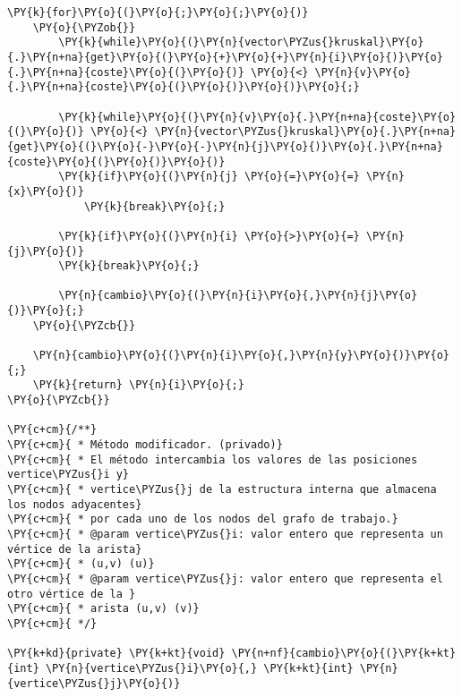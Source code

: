 \begin{Verbatim}[commandchars=\\\{\}]
    \PY{k}{for}\PY{o}{(}\PY{o}{;}\PY{o}{;}\PY{o}{)}
	\PY{o}{\PYZob{}}
	    \PY{k}{while}\PY{o}{(}\PY{n}{vector\PYZus{}kruskal}\PY{o}{.}\PY{n+na}{get}\PY{o}{(}\PY{o}{+}\PY{o}{+}\PY{n}{i}\PY{o}{)}\PY{o}{.}\PY{n+na}{coste}\PY{o}{(}\PY{o}{)} \PY{o}{<} \PY{n}{v}\PY{o}{.}\PY{n+na}{coste}\PY{o}{(}\PY{o}{)}\PY{o}{)}\PY{o}{;}

	    \PY{k}{while}\PY{o}{(}\PY{n}{v}\PY{o}{.}\PY{n+na}{coste}\PY{o}{(}\PY{o}{)} \PY{o}{<} \PY{n}{vector\PYZus{}kruskal}\PY{o}{.}\PY{n+na}{get}\PY{o}{(}\PY{o}{-}\PY{o}{-}\PY{n}{j}\PY{o}{)}\PY{o}{.}\PY{n+na}{coste}\PY{o}{(}\PY{o}{)}\PY{o}{)}
		\PY{k}{if}\PY{o}{(}\PY{n}{j} \PY{o}{=}\PY{o}{=} \PY{n}{x}\PY{o}{)}
		    \PY{k}{break}\PY{o}{;}

	    \PY{k}{if}\PY{o}{(}\PY{n}{i} \PY{o}{>}\PY{o}{=} \PY{n}{j}\PY{o}{)}
		\PY{k}{break}\PY{o}{;}

	    \PY{n}{cambio}\PY{o}{(}\PY{n}{i}\PY{o}{,}\PY{n}{j}\PY{o}{)}\PY{o}{;}
	\PY{o}{\PYZcb{}}

    \PY{n}{cambio}\PY{o}{(}\PY{n}{i}\PY{o}{,}\PY{n}{y}\PY{o}{)}\PY{o}{;}
    \PY{k}{return} \PY{n}{i}\PY{o}{;}
\PY{o}{\PYZcb{}}

\PY{c+cm}{/**}
\PY{c+cm}{ * Método modificador. (privado)}
\PY{c+cm}{ * El método intercambia los valores de las posiciones vertice\PYZus{}i y}
\PY{c+cm}{ * vertice\PYZus{}j de la estructura interna que almacena los nodos adyacentes}
\PY{c+cm}{ * por cada uno de los nodos del grafo de trabajo.}
\PY{c+cm}{ * @param vertice\PYZus{}i: valor entero que representa un vértice de la arista}
\PY{c+cm}{ * (u,v) (u)}
\PY{c+cm}{ * @param vertice\PYZus{}j: valor entero que representa el otro vértice de la }
\PY{c+cm}{ * arista (u,v) (v)}
\PY{c+cm}{ */}

\PY{k+kd}{private} \PY{k+kt}{void} \PY{n+nf}{cambio}\PY{o}{(}\PY{k+kt}{int} \PY{n}{vertice\PYZus{}i}\PY{o}{,} \PY{k+kt}{int} \PY{n}{vertice\PYZus{}j}\PY{o}{)}
\end{Verbatim}
